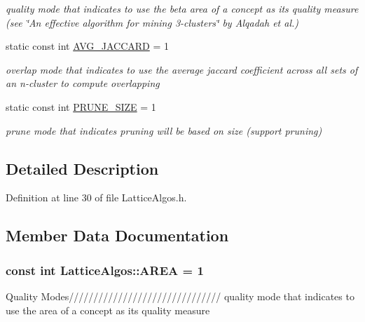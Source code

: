 \begin{DoxyCompactItemize}
\begin{DoxyCompactList}\small\item\em quality mode that indicates to use the beta area of a concept as its quality measure (see \char`\"{}An effective algorithm for mining 3-\/clusters\char`\"{} by Alqadah et al.) \item\end{DoxyCompactList}\item 
static const int \hyperlink{class_lattice_algos_a24156b300d4b23d0d618f548091d0aeb}{AVG\_\-JACCARD} = 1
\begin{DoxyCompactList}\small\item\em overlap mode that indicates to use the average jaccard coefficient across all sets of an n-\/cluster to compute overlapping \item\end{DoxyCompactList}\item 
static const int \hyperlink{class_lattice_algos_a9a1d69347724b131f372706322776bbb}{PRUNE\_\-SIZE} = 1
\begin{DoxyCompactList}\small\item\em prune mode that indicates pruning will be based on size (support pruning) \item\end{DoxyCompactList}\end{DoxyCompactItemize}


\subsection{Detailed Description}


Definition at line 30 of file LatticeAlgos.h.



\subsection{Member Data Documentation}
\hypertarget{class_lattice_algos_a0a79ddaab00906dea5756ac05a4861a5}{
\subsubsection[{AREA}]{\setlength{\rightskip}{0pt plus 5cm}const int {\bf LatticeAlgos::AREA} = 1}}
\label{class_lattice_algos_a0a79ddaab00906dea5756ac05a4861a5}
Quality Modes/////////////////////////////// quality mode that indicates to use the area of a concept as its quality measure 

